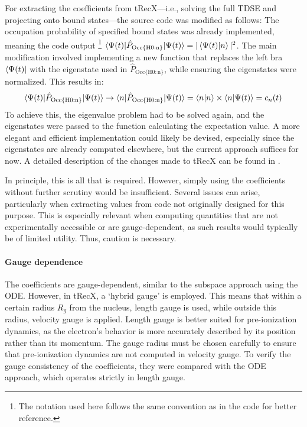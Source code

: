 For extracting the coefficients from tRecX—i.e., solving the full TDSE and projecting onto bound states—the source code was modified as follows:
The occupation probability of specified bound states was already implemented, meaning the code output \footnote{The notation used here follows the same convention as in the code for better reference.}  $\braket{\Psi(t)|\hat{P}_{\mathrm{Occ\{H0:n\}}}|\Psi(t)}=|\braket{\Psi(t)|n}|^2$.
The main modification involved implementing a new function that replaces the left bra $\bra{\Psi(t)}$ with the eigenstate used in $\hat{P}_{\mathrm{Occ\{H0:n\}}}$, while ensuring the eigenstates were normalized.
This results in:
\begin{equation*}
    \braket{\Psi(t)|\hat{P}_{\mathrm{Occ\{H0:n\}}}|\Psi(t)} \rightarrow \braket{n|\hat{P}_{\mathrm{Occ\{H0:n\}}}|\Psi(t)} = \braket{n|n}\times\braket{n|\Psi(t)} = c_n(t)
\end{equation*}
To achieve this, the eigenvalue problem had to be solved again, and the eigenstates were passed to the function calculating the expectation value.
A more elegant and efficient implementation could likely be devised, especially since the eigenstates are already computed elsewhere, but the current approach suffices for now.
A detailed description of the changes made to tRecX can be found in \cite{johannes_porsch_2025_16223179}.

\bigskip
In principle, this is all that is required.
However, simply using the coefficients without further scrutiny would be insufficient.
Several issues can arise, particularly when extracting values from code not originally designed for this purpose.
This is especially relevant when computing quantities that are not experimentally accessible or are gauge-dependent, as such results would typically be of limited utility.
Thus, caution is necessary.

\paragraph{Gauge dependence}
The coefficients are gauge-dependent, similar to the subspace approach using the ODE.
However, in tRecX, a `hybrid gauge' is employed.
This means that within a certain radius $R_g$ from the nucleus, length gauge is used, while outside this radius, velocity gauge is applied.
Length gauge is better suited for pre-ionization dynamics, as the electron's behavior is more accurately described by its position rather than its momentum.
The gauge radius must be chosen carefully to ensure that pre-ionization dynamics are not computed in velocity gauge.
To verify the gauge consistency of the coefficients, they were compared with the ODE approach, which operates strictly in length gauge.







